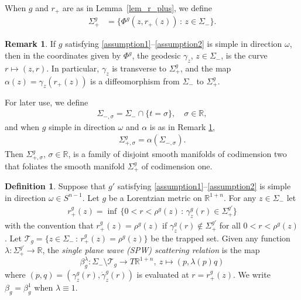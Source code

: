 \documentclass[11pt,letterpaper]{amsart}
\theoremstyle{definition}
\newtheorem{Definition}[Theorem]{Definition}
\newtheorem{Remark}[Theorem]{Remark}
\numberwithin{equation}{section}
\def\R{\mathbb R}
\def\mid{\,:\,}
\begin{document}
When $g$ and $r_+$ are as in Lemma~\ref{lem_r_plus}, we define 
    \begin{align*}%
\Sigma_+^g &= \{ \Phi^g(z, r_+(z)) \mid z \in \Sigma_- \}.
    \end{align*}

\begin{Remark}\label{rem_alpha_diffeo}
If $g$ satisfying \eqref{assumption1}--\eqref{assumption2} is simple in direction $\omega$, then in the coordinates given by $\Phi^g$, the geodesic $\gamma_z$, $z \in \Sigma_-$, is the curve $r \mapsto (z, r)$. In particular, $\gamma_z$ is transverse to $\Sigma_+^g$, and the map $\alpha(z) = \gamma_z(r_+(z))$ is a diffeomorphism from $\Sigma_-$ to $\Sigma_+^g$.
\end{Remark}

For later use, we define 
    \begin{align*}
\Sigma_{-,\sigma} = \Sigma_- \cap \{t = \sigma\}, \quad \sigma \in \R,
    \end{align*}
and when $g$ simple in direction $\omega$ and $\alpha$ is as in Remark \ref{rem_alpha_diffeo},
    \begin{align}\label{def_Sigma_plus_sigma}
\Sigma_{+,\sigma}^g = \alpha(\Sigma_{-,\sigma}).
    \end{align}
Then $\Sigma_{+,\sigma}^g$, $\sigma \in \R$, is a family of disjoint smooth manifolds of codimension two that foliates the smooth manifold $\Sigma_+^g$ of codimension one.


\begin{Definition} \label{def_spw_scattering_relation}
Suppose that $g'$ satisfying \eqref{assumption1}--\eqref{assumption2} is simple in direction $\omega \in S^{n-1}$.
Let $g$ be a Lorentzian metric on $\R^{1 + n}$.
For any $z \in \Sigma_-$ let 
    \begin{align}\label{def_r_g}
r_+^{g}(z) = \inf \,\{ 0 < r < \rho^g(z) \,:\, \gamma_z^{g}(r) \in \Sigma_+^{g'} \}
    \end{align}
with the convention that $r_+^{g}(z) = \rho^g(z)$ if $\gamma_z^{g}(r) \notin \Sigma_+^{g'}$ for all $0 < r < \rho^g(z)$. Let $\mathcal{T}_{g} = \{ z \in \Sigma_- \,:\, r_+^{g}(z) = \rho^{g}(z) \}$ be the trapped set. Given any function $\lambda : \Sigma_+^{g'} \to \R$, the \emph{single plane wave (SPW) scattering relation} is the map 
\[
\beta_{g}^{\lambda}: \Sigma_- \setminus \mathcal{T}_{g} \to T \R^{1+n}, \ z \mapsto (p, \lambda(p) q)
\]
where $(p, q) = (\gamma_z^{g}(r), \dot \gamma_z^{g}(r))$ is evaluated at $r = r_+^{g}(z)$.
We write $\beta_{g} = \beta_{g}^1$ when $\lambda \equiv 1$.
\end{Definition}
\end{document}
